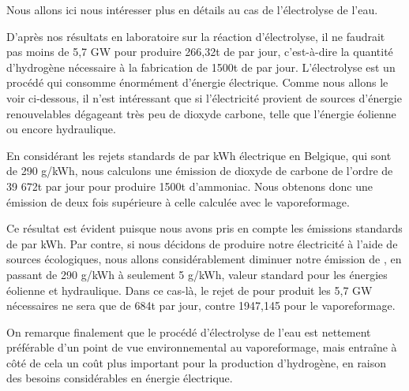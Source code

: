 \documentclass[a4paper, oneside, 12pt]{article}
\begin{document}
Nous allons ici nous intéresser plus en détails au cas de l'électrolyse de l'eau. 

D'après nos résultats en laboratoire sur la réaction d'électrolyse, il ne faudrait pas moins de 5,7 GW pour produire 266,32t de  par jour, c'est-à-dire la quantité d'hydrogène nécessaire à la fabrication de 1500t de  par jour. L'électrolyse est un procédé qui consomme énormément d'énergie électrique. Comme nous allons le voir ci-dessous, il n'est intéressant que si l'électricité provient de sources d'énergie renouvelables dégageant très peu de dioxyde carbone, telle que l'énergie éolienne ou encore hydraulique.

En considérant les rejets standards de  par kWh électrique en Belgique, qui sont de 290 g/kWh, nous calculons une émission de dioxyde de carbone de l'ordre de 39 672t par jour pour produire 1500t d'ammoniac. Nous obtenons donc une émission de  deux fois supérieure à celle calculée avec le vaporeformage.

Ce résultat est évident puisque nous avons pris en compte les émissions standards de  par kWh.
Par contre, si nous décidons de produire notre électricité à l'aide de sources écologiques, nous allons considérablement diminuer notre émission de , en passant de 290
g/kWh à seulement 5 g/kWh, valeur standard pour les énergies éolienne et hydraulique. Dans ce cas-là, le rejet de  pour produit les 5,7 GW nécessaires ne sera que de 684t par jour, contre 1947,145 pour le vaporeformage. 
\newline

On remarque finalement que le procédé d'électrolyse de l'eau est nettement préférable d'un point de vue environnemental au vaporeformage, mais entraîne à côté de cela un coût plus important pour la production d'hydrogène, en raison des besoins considérables en énergie électrique.
\end{document}
